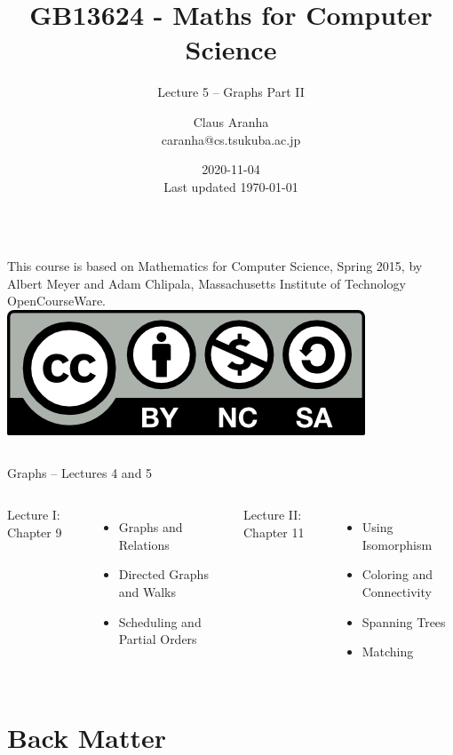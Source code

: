 \documentclass[aspectratio=169]{beamer}
\title[GB13624]{GB13624 - Maths for Computer Science}
\subtitle[]{Lecture 5 -- Graphs Part II}
\author[Claus Aranha]{Claus Aranha\\{\footnotesize caranha@cs.tsukuba.ac.jp}}
\institute[COINS]{College of Information Science}
\date[2020-11-04]{2020-11-04\\{\tiny Last updated \today}}
\begin{document}
\begin{frame}
  \maketitle

  \begin{columns}
    {\smaller This course is based on Mathematics for Computer Science, Spring
    2015, by Albert Meyer and Adam Chlipala, Massachusetts Institute
    of Technology OpenCourseWare.}
    \includegraphics[width=\textwidth]{../img/by-nc-sa}
  \end{columns}
\end{frame}

\begin{frame}{Graphs -- Lectures 4 and 5}
  \begin{columns}
    \begin{center}
      Lecture I: Chapter 9
    \end{center}
    \begin{itemize}
      \item Graphs and Relations
      \item Directed Graphs and Walks
      \item Scheduling and Partial Orders
    \end{itemize}

    \begin{center}
      Lecture II: Chapter 11
    \end{center}
    \begin{itemize}
    \item Using Isomorphism
    \item Coloring and Connectivity
    \item Spanning Trees
    \item Matching
    \end{itemize}
  \end{columns}
\end{frame}











\section{Back Matter}

\end{document}

